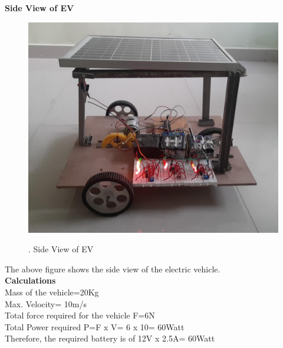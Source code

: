 \documentclass[a4paper,12pt]{article}
\begin{document}
\newpage
\textbf{Side View of EV}\\[1cm]
\begin{figure}[!h]
\centering
\includegraphics[scale=0.3]{sv.jpeg}\\
\caption{. Side View of EV}
\end{figure}

The above figure shows the side view of the electric vehicle.\\[1cm]
\textbf{Calculations}\\[0.5cm]
Mass of the vehicle=20Kg\\
Max. Velocity= 10m/s\\
Total force required for the vehicle F=6N\\
Total Power required P=F x V= 6 x 10= 60Watt\\
Therefore, the required battery is of 12V x 2.5A= 60Watt

\newpage
\end{document}
